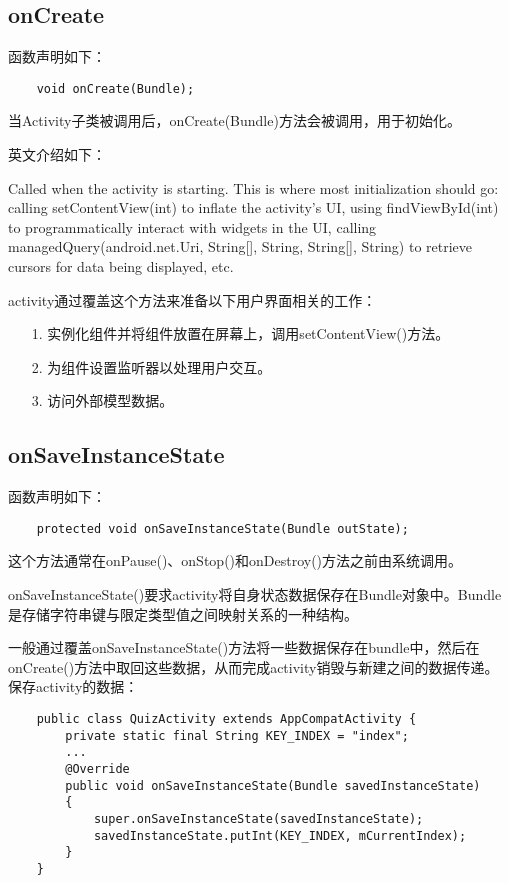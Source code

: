 \documentclass[a4paper,left=2.5cm,right=2.5cm,11pt]{article}
\begin{document}
\subsection{onCreate}
	函数声明如下：
	\begin{lstlisting}
	void onCreate(Bundle);
	\end{lstlisting}

	当Activity子类被调用后，onCreate(Bundle)方法会被调用，用于初始化。\par

	英文介绍如下：\par
	Called when the activity is starting. 
	This is where most initialization should go: calling setContentView(int) to inflate the activity's UI, 
	using findViewById(int) to programmatically interact with widgets in the UI, 
	calling managedQuery(android.net.Uri, String[], String, String[], String) to retrieve cursors for data being displayed, etc.\par

	activity通过覆盖这个方法来准备以下用户界面相关的工作：
	\begin{itemize}
		\item[1.] 实例化组件并将组件放置在屏幕上，调用setContentView()方法。
		\item[2.] 为组件设置监听器以处理用户交互。
		\item[3.] 访问外部模型数据。
	\end{itemize}

\subsection{onSaveInstanceState}
	函数声明如下：
	\begin{lstlisting}
	protected void onSaveInstanceState(Bundle outState);
	\end{lstlisting}

	这个方法通常在onPause()、onStop()和onDestroy()方法之前由系统调用。\par

	onSaveInstanceState()要求activity将自身状态数据保存在Bundle对象中。Bundle是存储字符串键与限定类型值之间映射关系的一种结构。\par

	一般通过覆盖onSaveInstanceState()方法将一些数据保存在bundle中，然后在onCreate()方法中取回这些数据，从而完成activity销毁与新建之间的数据传递。保存activity的数据：
	\begin{lstlisting}
	public class QuizActivity extends AppCompatActivity {
		private static final String KEY_INDEX = "index";
		...
		@Override
		public void onSaveInstanceState(Bundle savedInstanceState)
		{
			super.onSaveInstanceState(savedInstanceState);
			savedInstanceState.putInt(KEY_INDEX, mCurrentIndex);
		}
	}
	\end{lstlisting}
\end{document}
